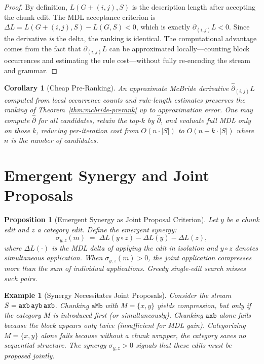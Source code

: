 \documentclass[11pt]{article}
\newtheorem{proposition}{Proposition}
\newtheorem{example}{Example}
\newtheorem{corollary}{Corollary}
\begin{document}
\begin{proof}
By definition, $L(G + (i,j), S)$ is the description length after accepting the chunk edit. The MDL acceptance criterion is $\Delta L = L(G + (i,j), S) - L(G, S) < 0$, which is exactly $\partial_{(i,j)} L < 0$. Since the derivative \emph{is} the delta, the ranking is identical. The computational advantage comes from the fact that $\partial_{(i,j)} L$ can be approximated locally---counting block occurrences and estimating the rule cost---without fully re-encoding the stream and grammar.
\end{proof}

\begin{corollary}[Cheap Pre-Ranking]
\label{cor:prerank}
An approximate McBride derivative $\widehat{\partial}_{(i,j)} L$ computed from local occurrence counts and rule-length estimates preserves the ranking of Theorem~\ref{thm:mcbride-prerank} up to approximation error. One may compute $\widehat{\partial}$ for all candidates, retain the top-$k$ by $\widehat{\partial}$, and evaluate full MDL only on those $k$, reducing per-iteration cost from $O(n \cdot |S|)$ to $O(n + k \cdot |S|)$ where $n$ is the number of candidates.
\end{corollary}

\section{Emergent Synergy and Joint Proposals}

\begin{proposition}[Emergent Synergy as Joint Proposal Criterion]
\label{prop:synergy}
Let $y$ be a chunk edit and $z$ a category edit. Define the emergent synergy:
\[
\sigma_{y,z}(m) \;=\; \Delta L(y \circ z) - \Delta L(y) - \Delta L(z),
\]
where $\Delta L(\cdot)$ is the MDL delta of applying the edit in isolation and $y \circ z$ denotes simultaneous application. When $\sigma_{y,z}(m) > 0$, the joint application compresses more than the sum of individual applications. Greedy single-edit search misses such pairs.
\end{proposition}

\begin{example}[Synergy Necessitates Joint Proposals]
Consider the stream $S = \texttt{axb\,ayb\,axb}$. Chunking $\texttt{aMb}$ with $M = \{x, y\}$ yields compression, but only if the category $M$ is introduced first (or simultaneously). Chunking $\texttt{axb}$ alone fails because the block appears only twice (insufficient for MDL gain). Categorizing $M = \{x, y\}$ alone fails because without a chunk wrapper, the category saves no sequential structure. The synergy $\sigma_{y,z} > 0$ signals that these edits must be proposed jointly.
\end{example}
\end{document}
